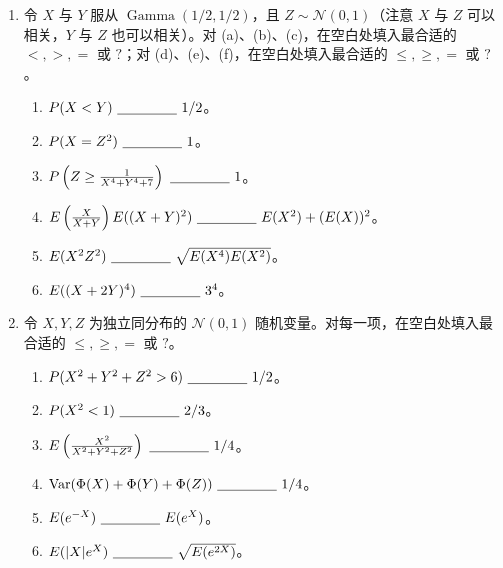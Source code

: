 \documentclass[UTF8, 12pt, fontset=fandol, oneside]{ctexart}
\begin{document}
\begin{enumerate}
  \item 令 $X$ 与 $Y$ 服从 $\operatorname{Gamma}(1/2,1/2)$，且 $Z\sim\mathcal N(0,1)$（注意 $X$ 与 $Z$ 可以相关，$Y$ 与 $Z$ 也可以相关）。对 (a)、(b)、(c)，在空白处填入最合适的 $<,>,=$ 或 $?$；对 (d)、(e)、(f)，在空白处填入最合适的 $\le,\ge,=$ 或 $?$。
  \begin{enumerate}
    \item $P(X<Y)\ \underline{\hspace{1.5cm}}\ 1/2$。
    \item $P(X=Z^2)\ \underline{\hspace{1.5cm}}\ 1$。
    \item $P\left(Z\ge \frac1{X^4+Y^4+7}\right)\ \underline{\hspace{1.5cm}}\ 1$。
    \item $E\left(\frac{X}{X+Y}\right)E((X+Y)^2)\ \underline{\hspace{1.5cm}}\ E(X^2)+(E(X))^2$。
    \item $E(X^2Z^2)\ \underline{\hspace{1.5cm}}\ \sqrt{E(X^4)E(X^2)}$。
    \item $E((X+2Y)^4)\ \underline{\hspace{1.5cm}}\ 3^4$。
  \end{enumerate}

  \item 令 $X,Y,Z$ 为独立同分布的 $\mathcal N(0,1)$ 随机变量。对每一项，在空白处填入最合适的 $\le,\ge,=$ 或 $?$。
  \begin{enumerate}
    \item $P(X^2+Y^2+Z^2>6)\ \underline{\hspace{1.5cm}}\ 1/2$。
    \item $P(X^2<1)\ \underline{\hspace{1.5cm}}\ 2/3$。
    \item $E\left(\frac{X^2}{X^2+Y^2+Z^2}\right)\ \underline{\hspace{1.5cm}}\ 1/4$。
    \item $\operatorname{Var}(\Phi(X)+\Phi(Y)+\Phi(Z))\ \underline{\hspace{1.5cm}}\ 1/4$。
    \item $E(e^{-X})\ \underline{\hspace{1.5cm}}\ E(e^X)$。
    \item $E(|X|e^X)\ \underline{\hspace{1.5cm}}\ \sqrt{E(e^{2X})}$。
  \end{enumerate}


\end{enumerate}
\end{document}
